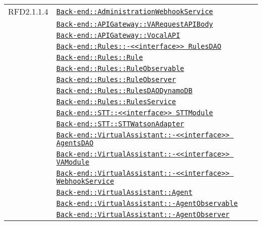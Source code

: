 \begin{longtable}{|>{\centering}m{3cm}|m{10cm}<{\centering}|}
RFD2.1.1.4 & \hyperref[Back-end::AdministrationWebhookService]{\texttt{Back-end::AdministrationWebhookService}}\\
& \hyperref[Back-end::APIGateway::VARequestAPIBody]{\texttt{Back-end::APIGateway::VARequestAPIBody}}\\
& \hyperref[Back-end::APIGateway::VocalAPI]{\texttt{Back-end::APIGateway::VocalAPI}}\\
& \hyperref[Back-end::Rules::<<interface>> RulesDAO]{\texttt{Back-end::Rules::-\linebreak <<interface>> RulesDAO}}\\
& \hyperref[Back-end::Rules::Rule]{\texttt{Back-end::Rules::Rule}}\\
& \hyperref[Back-end::Rules::RuleObservable]{\texttt{Back-end::Rules::RuleObservable}}\\
& \hyperref[Back-end::Rules::RuleObserver]{\texttt{Back-end::Rules::RuleObserver}}\\
& \hyperref[Back-end::Rules::RulesDAODynamoDB]{\texttt{Back-end::Rules::RulesDAODynamoDB}}\\
& \hyperref[Back-end::Rules::RulesService]{\texttt{Back-end::Rules::RulesService}}\\
& \hyperref[Back-end::STT::<<interface>> STTModule]{\texttt{Back-end::STT::<<interface>> STTModule}}\\
& \hyperref[Back-end::STT::STTWatsonAdapter]{\texttt{Back-end::STT::STTWatsonAdapter}}\\
& \hyperref[Back-end::VirtualAssistant::<<interface>> AgentsDAO]{\texttt{Back-end::VirtualAssistant::-\linebreak <<interface>> AgentsDAO}}\\
& \hyperref[Back-end::VirtualAssistant::<<interface>> VAModule]{\texttt{Back-end::VirtualAssistant::-\linebreak <<interface>> VAModule}}\\
& \hyperref[Back-end::VirtualAssistant::<<interface>> WebhookService]{\texttt{Back-end::VirtualAssistant::-\linebreak <<interface>> WebhookService}}\\
& \hyperref[Back-end::VirtualAssistant::Agent]{\texttt{Back-end::VirtualAssistant::Agent}}\\
& \hyperref[Back-end::VirtualAssistant::AgentObservable]{\texttt{Back-end::VirtualAssistant::-\linebreak AgentObservable}}\\
& \hyperref[Back-end::VirtualAssistant::AgentObserver]{\texttt{Back-end::VirtualAssistant::-\linebreak AgentObserver}}\\

\end{longtable}
